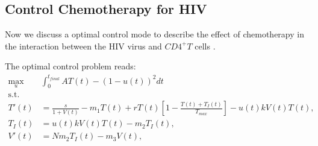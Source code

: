 \subsection{Control Chemotherapy for HIV} 
	Now we discuss a optimal control mode to describe the effect of chemotherapy
in the interaction between the HIV virus and $CD4^+T$ cells 
\cite{butler1997optimal}.


The optimal control problem reads:
\begin{equation} \label{eqn:hiv_infect}
	\begin{aligned}
		\max_{u} & \int_{0}^{t_{final}}
			A  T(t) - (1-u(t)) ^ 2 dt
		\\
		\text{s.t. }
		\\
			T'(t) &=
				\frac{s}{1 + V(t)}
				- m_1 T(t) 
				+ r T(t)
				\left[
					1 - \frac{T(t)+ T_{I}(t)}{T_{max}}
				\right] 
				- u(t) k V(t) T(t),
			\\
			T_{I}(t) &=
				u(t) k V(t) T(t) - m_2 T_{I}(t),
			\\
			V'(t) &= N m_2 T_{I}(t) - m_3 V(t),
			\\
	\end{aligned}
\end{equation}


